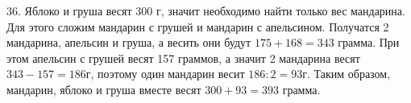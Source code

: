 36. Яблоко и груша весят 300 г, значит необходимо найти только вес мандарина. Для этого сложим мандарин с грушей и мандарин с апельсином. Получатся 2 мандарина, апельсин и груша, а весить они будут $175+168=343$ грамма. При этом апельсин с грушей весят 157 граммов, а значит 2 мандарина весят $343-157=186$г, поэтому один мандарин весит $186:2=93$г. Таким образом, мандарин, яблоко и груша вместе весят $300+93=393$ грамма.\\
